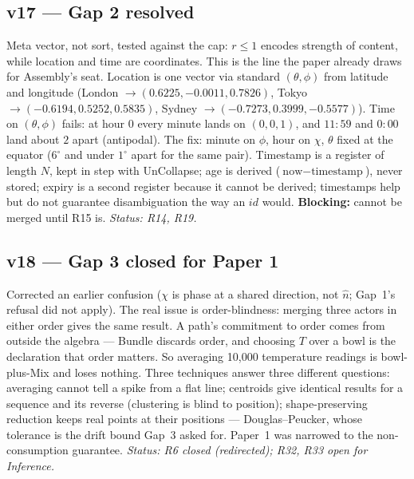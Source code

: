 \documentclass[11pt]{article}
\begin{document}
\subsection*{v17 --- Gap 2 resolved}
Meta vector, not sort, tested against the cap: $r\le1$ encodes
strength of content, while location and time are coordinates. This is
the line the paper already draws for Assembly's seat. Location is
one vector via standard $(\theta,\phi)$ from latitude and longitude
(London $\to(0.6225,-0.0011,0.7826)$, Tokyo
$\to(-0.6194,0.5252,0.5835)$, Sydney $\to(-0.7273,0.3999,-0.5577)$).
Time on $(\theta,\phi)$ fails: at hour $0$ every minute lands on
$(0,0,1)$, and $11{:}59$ and $0{:}00$ land about $2$ apart
(antipodal). The fix: minute on $\phi$, hour on $\chi$, $\theta$
fixed at the equator ($6^\circ$ and under $1^\circ$ apart for the
same pair). Timestamp is a register of length $N$, kept in step with
UnCollapse; age is derived ($\text{now}-\text{timestamp}$), never
stored; expiry is a second register because it cannot be derived;
timestamps help but do not guarantee disambiguation the way an $id$
would. \textbf{Blocking:} cannot be merged until R15 is.
\emph{Status: R14, R19.}

\subsection*{v18 --- Gap 3 closed for Paper 1}
Corrected an earlier confusion ($\chi$ is phase at a shared direction,
not $\hat n$; Gap~1's refusal did not apply). The real issue is
order-blindness: merging three actors in either order gives the same
result. A path's commitment to order comes from outside the algebra
--- Bundle discards order, and choosing $T$ over a bowl is the
declaration that order matters. So averaging 10{,}000 temperature
readings is bowl-plus-Mix and loses nothing. Three techniques answer
three different questions: averaging cannot tell a spike from a flat
line; centroids give identical results for a sequence and its reverse
(clustering is blind to position); shape-preserving reduction keeps
real points at their positions --- Douglas--Peucker, whose tolerance
is the drift bound Gap~3 asked for. Paper~1 was narrowed to the
non-consumption guarantee. \emph{Status: R6 closed (redirected);
R32, R33 open for Inference.}
\end{document}
